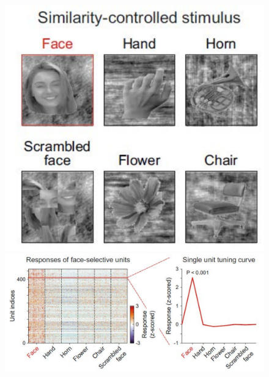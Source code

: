 \documentclass[sn-mathphys]{sn-jnl}%
\theoremstyle{thmstyleone}%
\theoremstyle{thmstyletwo}%
\theoremstyle{thmstylethree}%
\begin{document}
\begin{figure}[htbp]
	\centering
	
	\subfigure%
	{
		\begin{minipage}[t]{1.0\linewidth}
			\centering
			\includegraphics[width=1.0\textwidth]{figs/fig_1_c.pdf}
		\end{minipage}%
	}%
	
	\subfigure%
	{
		\begin{minipage}[t]{1.0\linewidth}
			\centering
			\includegraphics[width=1.0\textwidth]{figs/fig_1_d.pdf}
		\end{minipage}
	}%
	

\end{figure}
\end{document}
